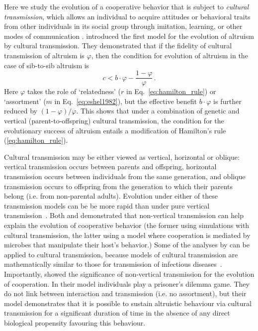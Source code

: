 \documentclass[12pt]{extarticle}
\begin{document}
Here we study the evolution of a cooperative behavior that is subject to \emph{cultural transmission}, which allows an individual to acquire attitudes or behavioral traits from other individuals in its social group through imitation, learning, or other modes of communication \citep{cavalli1981cultural,richerson2008not}.
\citet{feldman1985gene} introduced the first model for the evolution of altruism by cultural transmission.
They demonstrated that if the fidelity of cultural transmission of altruism is $\varphi$, then the condition for evolution of altruism in the case of sib-to-sib altruism is \citep[Eq.~16]{feldman1985gene}
\begin{equation} \label{eq:feldman1985}
c < b \cdot \varphi - \frac{1-\varphi}{\varphi} \,.
\end{equation}
Here $\varphi$ takes the role of `relatedness' ($r$ in Eq.~\ref{eq:hamilton_rule}) or `assortment' ($m$ in Eq.~\ref{eq:eshel1982}), but the effective benefit $b\cdot \varphi$ is further reduced by $(1-\varphi)/\varphi$. This shows that under a combination of genetic and vertical (parent-to-offspring) cultural transmission, the condition for the evolutionary success of altruism entails a modification of Hamilton's rule (\autoref{eq:hamilton_rule}).

Cultural transmission may be either viewed as vertical, horizontal or oblique:  vertical transmission occurs between parents and offspring, horizontal transmission occurs between individuals from the same generation, and oblique transmission occurs  to offspring from the generation to which their parents belong (i.e. from non-parental adults). 
Evolution under either of these transmission models can be be more rapid than under pure vertical transmission~\citep{cavalli1981cultural,lycett2008questions,ram2018evolution}.
Both \citet{woodcock2006significance} and \citet{lewin2017microbes} demonstrated that non-vertical transmission can help explain the evolution of cooperative behavior (the former using simulations with cultural transmission, the latter using a model where cooperation is mediated by microbes that manipulate their host's behavior.) 
Some of the analyses by \citet{lewin2017microbes} can be applied to cultural transmission, because models of cultural transmission are mathematically similar to those for transmission of infectious diseases~\citep{cavalli1981cultural}.
Importantly, \citet{woodcock2006significance} showed the significance of non-vertical transmission for the evolution of cooperation. In their model individuals play a prisoner's dilemma game.
They do not link between interaction and transmission (i.e. no assortment), but their model demonstrates that it is possible to sustain altruistic behaviour via cultural transmission for a significant duration of time in the absence of any direct biological propensity favouring this behaviour.
\end{document}
